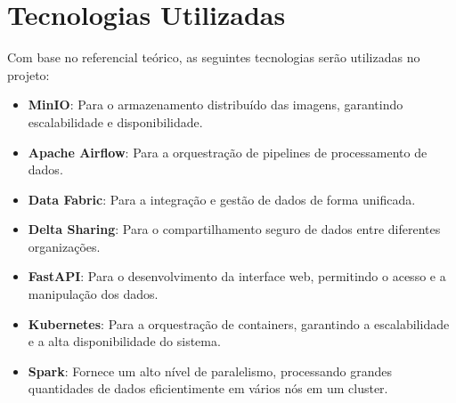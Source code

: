 \section{Tecnologias Utilizadas}

Com base no referencial teórico, as seguintes tecnologias serão utilizadas no projeto:
\begin{itemize}
    \item \textbf{MinIO}: Para o armazenamento distribuído das imagens, garantindo escalabilidade e disponibilidade.
    \item \textbf{Apache Airflow}: Para a orquestração de pipelines de processamento de dados.
    \item \textbf{Data Fabric}: Para a integração e gestão de dados de forma unificada.
    \item \textbf{Delta Sharing}: Para o compartilhamento seguro de dados entre diferentes organizações.
    \item \textbf{FastAPI}: Para o desenvolvimento da interface web, permitindo o acesso e a manipulação dos dados.
    \item \textbf{Kubernetes}: Para a orquestração de containers, garantindo a escalabilidade e a alta disponibilidade do sistema.
    \item \textbf{Spark}: Fornece um alto nível de paralelismo, processando grandes quantidades de dados eficientimente em vários nós em um cluster.
\end{itemize}




